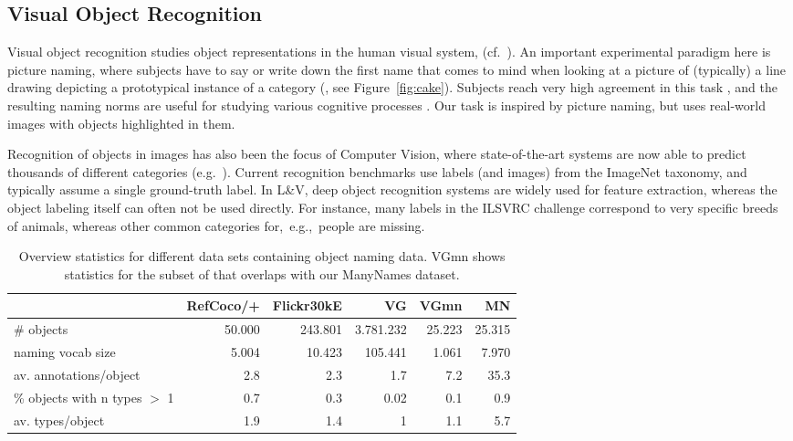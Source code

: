 \subsection{Visual Object Recognition}

Visual object recognition studies object representations in the human visual system, (cf.\ ). 
An important experimental paradigm here is picture naming, where subjects have to say or write down the first name that comes to mind when looking at a picture of (typically) a line drawing depicting a prototypical instance of a category (, see Figure\ \ref{fig:cake}).
Subjects reach very high agreement in this task \cite{rossion2004revisiting}, and the resulting naming norms are useful for studying various cognitive processes \cite{humphreys1988cascade}.
Our task is inspired by picture naming, but uses real-world images with objects highlighted in them.

Recognition of objects in images has also been the focus of Computer Vision, where state-of-the-art systems are now able to predict thousands of different categories (e.g.\ ). 
Current recognition benchmarks use labels (and images) from the ImageNet \cite{imagenet_cvpr09} taxonomy, and typically assume a single ground-truth label.
In L\&V, deep object recognition systems are widely used for feature extraction, whereas the object labeling itself can often not be used directly. For instance, many labels in the ILSVRC  challenge \cite{ILSVRC15} correspond to very specific breeds of animals, whereas other common categories for,\ e.g.,\ people are missing.

\begin{table*}[htb]
  \centering
  \begin{tabular}{lrrrrr}
    \toprule
    &   RefCoco/+  &  Flickr30kE &           VG &      VGmn &        MN \\
    \midrule
    \# objects & 50.000 & 243.801 & 3.781.232 & 25.223 & 25.315 \\
    naming vocab size &  5.004 &  10.423 &   105.441 &  1.061 &  7.970 \\
    av. annotations/object &      2.8 &       2.3 &         1.7 &      7.2 &     35.3 \\
    \% objects with n types $>$ 1 &      0.7 &       0.3 &         0.02 &      0.1 &      0.9 \\
    av. types/object &      1.9 &       1.4 &         1 &      1.1 &      5.7 \\
    \bottomrule
  \end{tabular}
  \label{tab:compare}
  \caption{Overview statistics for different data sets containing object naming data. VGmn shows statistics for the subset of \vg that overlaps with our ManyNames dataset.   }
\end{table*}

